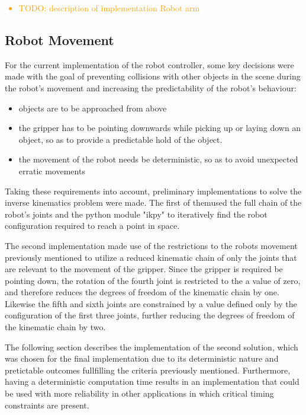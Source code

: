 \textcolor{orange}{
\begin{itemize}
    \item TODO: description of implementation Robot arm
\end{itemize}
} %


\subsection{Robot Movement}

For the current implementation of the robot controller, some key decisions were made with the goal of preventing collisions with other objects in the scene during the robot's movement and increasing the predictability of the robot's behaviour:

\begin{itemize}
    \item objects are to be approached from above
    \item the gripper has to be pointing downwards while picking up or laying down an object, so as to provide a predictable hold of the object.
    \item the movement of the robot needs be deterministic, so as to avoid unexpected erratic movements
\end{itemize}

Taking these requirements into account, preliminary implementations to solve the inverse kinematics problem were made. The first of themused the full chain of the robot's joints and the python module "ikpy" to iteratively find the robot configuration required to reach a point in space.

The second implementation made use of the restrictions to the robots movement previously mentioned to utilize a reduced kinematic chain of only the joints that are relevant to the movement of the gripper.
Since the gripper is required be pointing down, the rotation of the fourth joint is restricted to the a value of zero, and therefore reduces the degrees of freedom of the kinematic chain by one. Likewise the fifth and sixth joints are constrained by a value defined only by the configuration of the first three joints, further reducing the degrees of freedom of the kinematic chain by two.

The following section describes the implementation of the second solution, which was chosen for the final implementation due to its deterministic nature and pretictable outcomes fullfilling the criteria previously mentioned. Furthermore, having a deterministic computation time results in an implementation that could be used with more reliability in other applications in which critical timing constraints are present.

